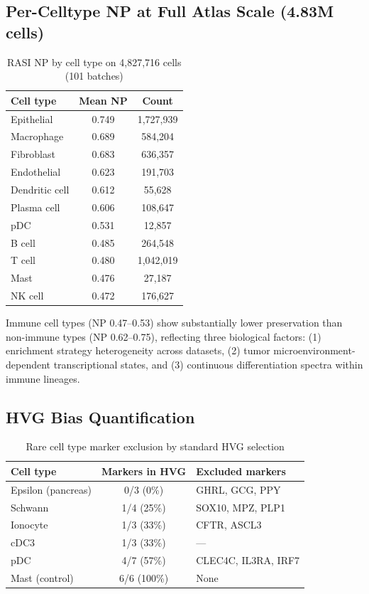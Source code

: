 \documentclass[10pt]{article}
\begin{document}
\subsection{Per-Celltype NP at Full Atlas Scale (4.83M cells)}

\begin{table}[h]
\centering
\caption{RASI NP by cell type on 4,827,716 cells (101 batches)}
\begin{tabular}{lcc}
\toprule
Cell type & Mean NP & Count \\
\midrule
Epithelial & 0.749 & 1,727,939 \\
Macrophage & 0.689 & 584,204 \\
Fibroblast & 0.683 & 636,357 \\
Endothelial & 0.623 & 191,703 \\
Dendritic cell & 0.612 & 55,628 \\
Plasma cell & 0.606 & 108,647 \\
pDC & 0.531 & 12,857 \\
B cell & 0.485 & 264,548 \\
T cell & 0.480 & 1,042,019 \\
Mast & 0.476 & 27,187 \\
NK cell & 0.472 & 176,627 \\
\bottomrule
\end{tabular}
\end{table}

Immune cell types (NP 0.47--0.53) show substantially lower preservation than non-immune types (NP 0.62--0.75), reflecting three biological factors: (1) enrichment strategy heterogeneity across datasets, (2) tumor microenvironment-dependent transcriptional states, and (3) continuous differentiation spectra within immune lineages.

\subsection{HVG Bias Quantification}

\begin{table}[h]
\centering
\caption{Rare cell type marker exclusion by standard HVG selection}
\begin{tabular}{lcl}
\toprule
Cell type & Markers in HVG & Excluded markers \\
\midrule
Epsilon (pancreas) & 0/3 (0\%) & GHRL, GCG, PPY \\
Schwann & 1/4 (25\%) & SOX10, MPZ, PLP1 \\
Ionocyte & 1/3 (33\%) & CFTR, ASCL3 \\
cDC3 & 1/3 (33\%) & --- \\
pDC & 4/7 (57\%) & CLEC4C, IL3RA, IRF7 \\
Mast (control) & 6/6 (100\%) & None \\
\bottomrule
\end{tabular}
\end{table}
\end{document}
